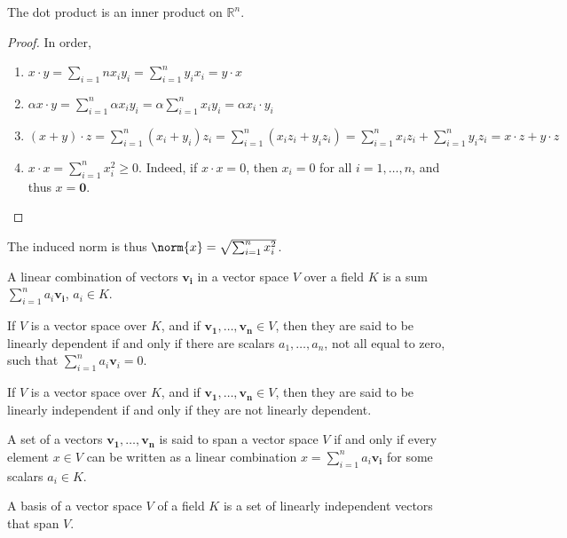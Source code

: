 \documentclass[crop=false,class=book]{standalone}
\begin{document}
\begin{theorem}
The dot product is an inner product on $\mathbb{R}^n$.
\end{theorem}
\begin{proof}
In order,
\begin{enumerate}
\item $x\cdot y = \sum_{i=1}{n} x_i y_i = \sum_{i=1}^{n} y_i x_i = y\cdot x$
\item $\alpha x\cdot y = \sum_{i=1}^{n} \alpha x_i y_i = \alpha \sum_{i=1}^{n} x_i y_i = \alpha x_i \cdot y_i$
\item $(x+y)\cdot z = \sum_{i=1}^{n} (x_i+y_i)z_i = \sum_{i=1}^{n} (x_iz_i +y_i z_i)=\sum_{i=1}^{n}x_i z_i+\sum_{i=1}^{n} y_i z_i = x\cdot z + y\cdot z$
\item $x\cdot x = \sum_{i=1}^{n} x_i^2 \geq 0$. Indeed, if $x\cdot x = 0$, then $x_i = 0$ for all $i=1,\hdots, n$, and thus $x=\mathbf{0}$.
\end{enumerate}
\end{proof}
\begin{remark}
The induced norm is thus $\norm{x} = \sqrt{\sum_{i=1}^{n} x_i^2}$.
\end{remark}
\begin{definition}
A linear combination of vectors $\mathbf{v_i}$ in a vector space $V$ over a field $K$ is a sum $\sum_{i=1}^{n} a_i \mathbf{v_i}$, $a_i \in K$.
\end{definition}
\begin{definition}
If $V$ is a vector space over $K$, and if $\mathbf{v_1},\hdots, \mathbf{v_n}\in V$, then they are said to be linearly dependent if and only if there are scalars $a_1,\hdots, a_n$, not all equal to zero, such that $\sum_{i=1}^{n} a_i \mathbf{v}_i = 0$.
\end{definition}
\begin{definition}
If $V$ is a vector space over $K$, and if $\mathbf{v_1},\hdots, \mathbf{v_n}\in V$, then they are said to be linearly independent if and only if they are not linearly dependent.
\end{definition}
\begin{definition}
A set of a vectors $\mathbf{v_1},\hdots, \mathbf{v_n}$ is said to span a vector space $V$ if and only if every element $x\in V$ can be written as a linear combination $x=\sum_{i=1}^{n} a_i \mathbf{v_i}$ for some scalars $a_i \in K$.
\end{definition}
\begin{definition}
A basis of a vector space $V$ of a field $K$ is a set of linearly independent vectors that span $V$.
\end{definition}
\end{document}
